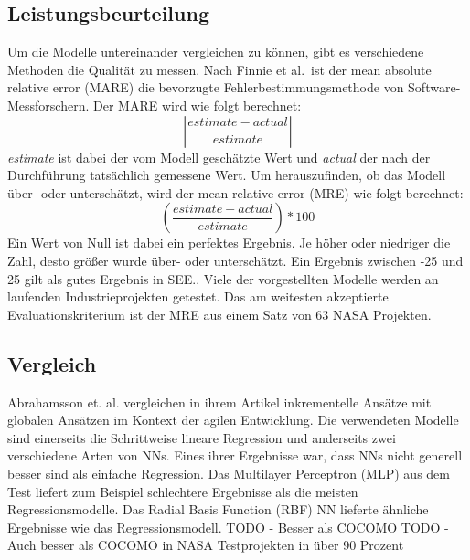 \subsection{Leistungsbeurteilung}
Um die Modelle untereinander vergleichen zu können, gibt es verschiedene Methoden die Qualität zu messen. Nach Finnie et al\cite{Finnie1996}.~ist der mean absolute relative error (MARE) die bevorzugte Fehlerbestimmungsmethode von Software-Messforschern. Der MARE wird wie folgt berechnet:
\begin{equation}
\left|\frac{estimate - actual}{estimate}\right|
\end{equation}
\textit{estimate} ist dabei der vom Modell geschätzte Wert und \textit{actual} der nach der Durchführung tatsächlich gemessene Wert. Um herauszufinden, ob das Modell über- oder unterschätzt, wird der mean relative error (MRE) wie folgt berechnet:
\begin{equation}
\left(\frac{estimate - actual}{estimate}\right)*100
\end{equation}
Ein Wert von Null ist dabei ein perfektes Ergebnis. Je höher oder niedriger die Zahl, desto größer wurde über- oder unterschätzt.\cite{Finnie1996} Ein Ergebnis zwischen -25 und 25 gilt als gutes Ergebnis in SEE.\cite{Abrahamsson2007}. Viele der vorgestellten Modelle werden an laufenden Industrieprojekten getestet. Das am weitesten akzeptierte Evaluationskriterium ist der MRE aus einem Satz von 63 NASA Projekten.\cite{Khalifelu2012}

\subsection{Vergleich}
Abrahamsson et. al. vergleichen in ihrem Artikel inkrementelle Ansätze mit globalen Ansätzen im Kontext der agilen Entwicklung. Die verwendeten Modelle sind einerseits die Schrittweise lineare Regression und anderseits zwei verschiedene Arten von NNs. Eines ihrer Ergebnisse war, dass NNs nicht generell besser sind als einfache Regression. Das Multilayer Perceptron (MLP) aus dem Test liefert zum Beispiel schlechtere Ergebnisse als die meisten Regressionsmodelle. Das Radial Basis Function (RBF) NN lieferte ähnliche Ergebnisse wie das Regressionsmodell.\cite{Abrahamsson2007}
TODO - Besser als COCOMO\cite{Khalifelu2012} %
TODO - Auch besser als COCOMO in NASA Testprojekten in über 90 Prozent\cite{Gharehchopogh2011} %